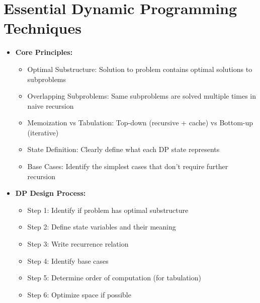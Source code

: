\documentclass[a4paper,10pt]{book}
\begin{document}
\chapter{Essential Dynamic Programming Techniques}
\label{sec:dp}
\begin{itemize}[leftmargin=*]
    \item \textbf{Core Principles:}
    \begin{itemize}
        \item Optimal Substructure: Solution to problem contains optimal solutions to subproblems
        \item Overlapping Subproblems: Same subproblems are solved multiple times in naive recursion
        \item Memoization vs Tabulation: Top-down (recursive + cache) vs Bottom-up (iterative)
        \item State Definition: Clearly define what each DP state represents
        \item Base Cases: Identify the simplest cases that don't require further recursion
    \end{itemize}

    \item \textbf{DP Design Process:}
    \begin{itemize}
        \item Step 1: Identify if problem has optimal substructure
        \item Step 2: Define state variables and their meaning
        \item Step 3: Write recurrence relation
        \item Step 4: Identify base cases
        \item Step 5: Determine order of computation (for tabulation)
        \item Step 6: Optimize space if possible
    \end{itemize}
\end{itemize}
\end{document}
